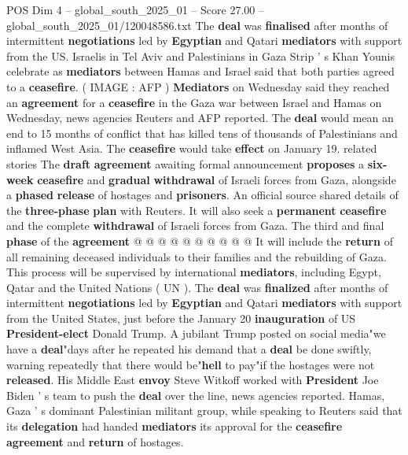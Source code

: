 \begin{textsample}{POS Dim 4 – global\_south\_2025\_01 – Score 27.00 – global\_south\_2025\_01/120048586.txt}  \label{ex:f4_pos_010}
The \textbf{deal} was \textbf{finalised} after months of intermittent \textbf{negotiations} led by \textbf{Egyptian} and Qatari \textbf{mediators} with support from the US.
Israelis in Tel Aviv and Palestinians in Gaza Strip ' s Khan Younis celebrate as \textbf{mediators} between Hamas and Israel said that both parties agreed to a \textbf{ceasefire}. ( IMAGE : AFP ) \textbf{Mediators} on Wednesday said they reached an \textbf{agreement} for a \textbf{ceasefire} in the Gaza war between Israel and Hamas on Wednesday, news agencies Reuters and AFP reported.
The \textbf{deal} would mean an end to 15 months of conflict that has killed tens of thousands of Palestinians and inflamed West Asia.
The \textbf{ceasefire} would take \textbf{effect} on January 19. related stories The \textbf{draft} \textbf{agreement} awaiting formal announcement \textbf{proposes} a \textbf{six-week} \textbf{ceasefire} and \textbf{gradual} \textbf{withdrawal} of Israeli forces from Gaza, alongside a \textbf{phased} \textbf{release} of hostages and \textbf{prisoners}.
An official source shared details of the \textbf{three-phase} \textbf{plan} with Reuters.
It will also seek a \textbf{permanent} \textbf{ceasefire} and the complete \textbf{withdrawal} of Israeli forces from Gaza.
The third and final \textbf{phase} of the \textbf{agreement} @ @ @ @ @ @ @ @ @ @ It will include the \textbf{return} of all remaining deceased individuals to their families and the rebuilding of Gaza.
This process will be supervised by international \textbf{mediators}, including Egypt, Qatar and the United Nations ( UN ).
The \textbf{deal} was \textbf{finalized} after months of intermittent \textbf{negotiations} led by \textbf{Egyptian} and Qatari \textbf{mediators} with support from the United States, just before the January 20 \textbf{inauguration} of US \textbf{President-elect} Donald Trump.
A jubilant Trump posted on social media"we have a \textbf{deal}"days after he repeated his demand that a \textbf{deal} be done swiftly, warning repeatedly that there would be"\textbf{hell} to pay"if the hostages were not \textbf{released}.
His Middle East \textbf{envoy} Steve Witkoff worked with \textbf{President} Joe Biden ' s team to push the \textbf{deal} over the line, news agencies reported.
Hamas, Gaza ' s dominant Palestinian militant group, while speaking to Reuters said that its \textbf{delegation} had handed \textbf{mediators} its approval for the \textbf{ceasefire} \textbf{agreement} and \textbf{return} of hostages.

\end{textsample}
